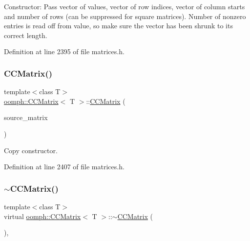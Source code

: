 Constructor\+: Pass vector of values, vector of row indices, vector of column starts and number of rows (can be suppressed for square matrices). Number of nonzero entries is read off from value, so make sure the vector has been shrunk to its correct length. 



Definition at line 2395 of file matrices.\+h.

\mbox{\label{classoomph_1_1CCMatrix_a815c8a3473ce3b8fe70c682e7591a33d}} 
\subsubsection{\texorpdfstring{C\+C\+Matrix()}{CCMatrix()}\hspace{0.1cm}{\footnotesize\ttfamily [3/3]}}
{\footnotesize\ttfamily template$<$class T$>$ \\
\hyperlink{classoomph_1_1CCMatrix}{oomph\+::\+C\+C\+Matrix}$<$ T $>$\+::\hyperlink{classoomph_1_1CCMatrix}{C\+C\+Matrix} (\begin{DoxyParamCaption}\item[{const \hyperlink{classoomph_1_1CCMatrix}{C\+C\+Matrix}$<$ T $>$ \&}]{source\+\_\+matrix }\end{DoxyParamCaption})\hspace{0.3cm}{\ttfamily [inline]}}



Copy constructor. 



Definition at line 2407 of file matrices.\+h.

\mbox{\label{classoomph_1_1CCMatrix_a5f6e403c6f6478abe752ca515d3120d9}} 
\subsubsection{\texorpdfstring{$\sim$\+C\+C\+Matrix()}{~CCMatrix()}}
{\footnotesize\ttfamily template$<$class T$>$ \\
virtual \hyperlink{classoomph_1_1CCMatrix}{oomph\+::\+C\+C\+Matrix}$<$ T $>$\+::$\sim$\hyperlink{classoomph_1_1CCMatrix}{C\+C\+Matrix} (\begin{DoxyParamCaption}{ }\end{DoxyParamCaption})\hspace{0.3cm}{\ttfamily [inline]}, {\ttfamily [virtual]}}



